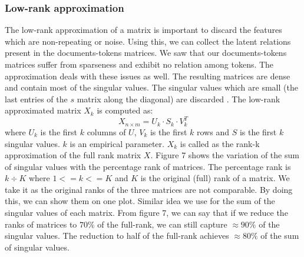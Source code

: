 \subsubsection{Low-rank approximation}
The low-rank approximation of a matrix is important to discard the features which are non-repeating or noise. Using this, we can collect the latent relations present in the documents-tokens matrices. We saw that our documents-tokens matrices suffer from sparseness and exhibit no relation among tokens. The approximation deals with these issues as well. The resulting matrices are dense and contain most of the singular values. The singular values which are small (the last entries of the $s$ matrix along the diagonal) are discarded \cite{DBLP:journals/corr/Yang15b}. The low-rank approximated matrix $X_k$ is computed as:
    \begin{equation}
    X_{n \times m} = U_{k} \cdot S_{k} \cdot V_{k}^T
    \end{equation}
    where $U_{k}$ is the first $k$ columns of $U$, $V_{k}$ is the first $k$ rows and $S$ is the first $k$ singular values. $k$ is an empirical parameter. $X_k$ is called as the rank-k approximation of the full rank matrix $X$. Figure 7 shows the variation of the sum of singular values with the percentage rank of matrices. The percentage rank is $k \div K$ where $1 <= k <= K$ and $K$ is the original (full) rank of a matrix. We take it as the original ranks of the three matrices are not comparable. By doing this, we can show them on one plot. Similar idea we use for the sum of the singular values of each matrix. From figure 7, we can say that if we reduce the ranks of matrices to $70\%$ of the full-rank, we can still capture $\approx 90\%$ of the singular values. The reduction to half of the full-rank achieves $\approx 80\%$ of the sum of singular values. 

